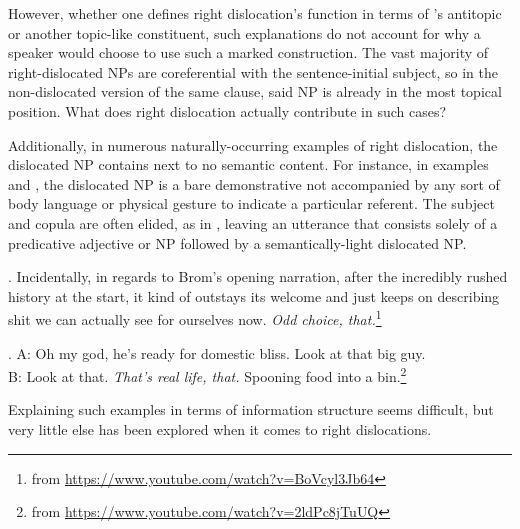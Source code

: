 \documentclass[titlepage,12pt]{article}
\begin{document}
However, whether one defines right dislocation's function in terms of  \citeauthor{lambrecht_topic_1981}'s antitopic or another topic-like constituent, such explanations do not account for why a speaker would choose to use such a marked construction. The vast majority of right-dislocated NPs are coreferential with the sentence-initial subject, so in the non-dislocated version of the same clause, said NP is already in the most topical position. What does right dislocation actually contribute in such cases?

Additionally, in numerous naturally-occurring examples of right dislocation, the dislocated NP contains next to no semantic content. For instance, in examples \Next and \NNext, the dislocated NP is a bare demonstrative not accompanied by any sort of body language or physical gesture to indicate a particular referent. The subject and copula are often elided, as in \Next, leaving an utterance that consists solely of a predicative adjective or NP followed by a semantically-light dislocated NP.

\ex. \label{eragon} Incidentally, in regards to Brom's opening narration, after the incredibly rushed history at the start, it kind of outstays its welcome and just keeps on describing shit we can actually see for ourselves now. \textit{Odd choice, that.}\footnote{from \url{https://www.youtube.com/watch?v=BoVcyl3Jb64}}

\ex. \label{dan} A: Oh my god, he's ready for domestic bliss. Look at that big guy.\\
B: Look at that. \textit{That's real life, that.} Spooning food into a bin.\footnote{from \url{https://www.youtube.com/watch?v=2ldPc8jTuUQ}}

Explaining such examples in terms of information structure seems difficult, but very little else has been explored when it comes to right dislocations.


\end{document}
